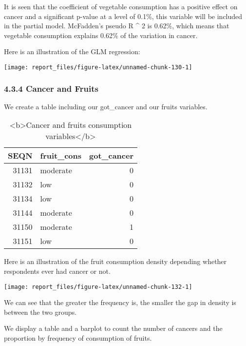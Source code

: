 \documentclass[
]{article}
\begin{document}
It is seen that the coefficient of vegetable consumption has a positive
effect on cancer and a significant p-value at a level of 0.1\%, this
variable will be included in the partial model. McFadden's pseudo R \^{}
2 is 0.62\%, which means that vegetable consumption explains 0.62\% of
the variation in cancer.

Here is an illustration of the GLM regression:

\begin{center}\texttt{[image: report\_files/figure-latex/unnamed-chunk-130-1]} \end{center}

\hypertarget{cancer-and-fruits}{%
\subsubsection{4.3.4 Cancer and Fruits}\label{cancer-and-fruits}}

We create a table including our got\_cancer and our fruits variables.

\begin{table}

\caption{\label{tab:unnamed-chunk-131}<b>Cancer and fruits consumption variables</b>}
\centering
\begin{tabular}[t]{r|l|r}
\hline
SEQN & fruit\_cons & got\_cancer\\
\hline
31131 & moderate & 0\\
\hline
31132 & low & 0\\
\hline
31134 & low & 0\\
\hline
31144 & moderate & 0\\
\hline
31150 & moderate & 1\\
\hline
31151 & low & 0\\
\hline
\end{tabular}
\end{table}

Here is an illustration of the fruit consumption density depending
whether respondents ever had cancer or not.

\begin{center}\texttt{[image: report\_files/figure-latex/unnamed-chunk-132-1]} \end{center}

We can see that the greater the frequency is, the smaller the gap in
density is between the two groups.

We display a table and a barplot to count the number of cancers and the
proportion by frequency of consumption of fruits.
\end{document}
